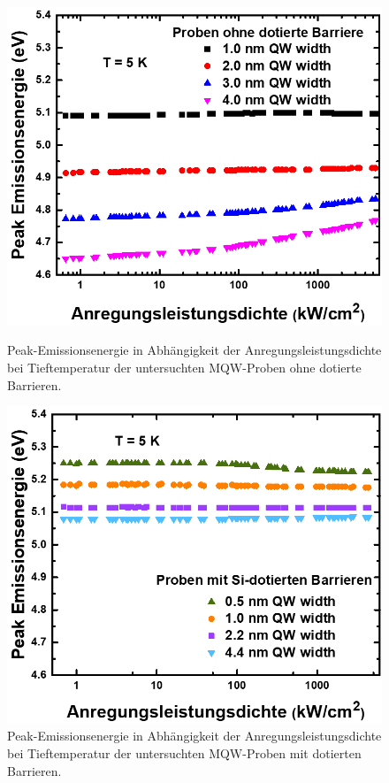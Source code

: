 \begin{figure}[H]
  \centering
  \begin{minipage}[t]{0.49\textwidth}
    \centering
    \includegraphics[width=\textwidth]{Bilder/MQWdickenSerie/PeakEnergieUndotiert.png}
		\caption{Peak-Emissionsenergie in Abhängigkeit der Anregungsleistungsdichte bei Tieftemperatur der untersuchten MQW-Proben ohne dotierte Barrieren.}
    \label{fig:undotiertpeak}
  \end{minipage}
	\hfill
  \begin{minipage}[t]{0.49\textwidth}
    \centering
    \includegraphics[width=\linewidth]{Bilder/MQWdickenSerie/PeakEnergieDotiert.png}
		\caption{Peak-Emissionsenergie in Abhängigkeit der Anregungsleistungsdichte bei Tieftemperatur der untersuchten MQW-Proben mit dotierten Barrieren.}
    \label{fig:dotiertpeak}
  \end{minipage}
\end{figure}
